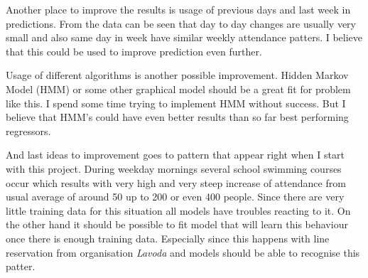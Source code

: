 \documentclass{article}
\begin{document}
Another place to improve the results is usage of previous days and last week in predictions. From the data can be seen that day to day changes are usually very small and also same day in week have similar weekly attendance patters. I believe that this could be used to improve prediction even further. 

Usage of different algorithms is another possible improvement. Hidden Markov Model (HMM) or some other graphical model should be a great fit for problem like this. I spend some time trying to implement HMM without success. But I believe that HMM's could have even better results than so far best performing regressors.

And last ideas to improvement goes to pattern that appear right when I start with this project. During weekday mornings several school swimming courses occur which results with very high and very steep increase of attendance from usual average of around 50 up to 200 or even 400 people. Since there are very little training data for this situation all models have troubles reacting to it. On the other hand it should be possible to fit model that will learn this behaviour once there is enough training data. Especially since this happens with line reservation from organisation \emph{Lavoda} and models should be able to recognise this patter.



\end{document}
